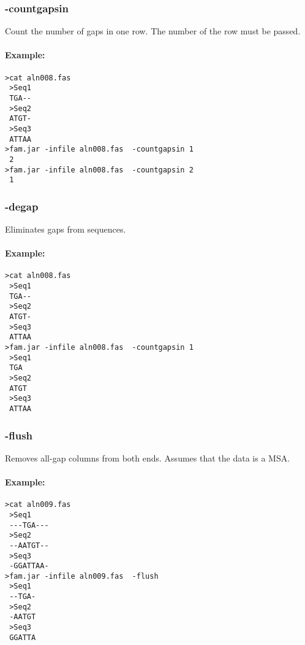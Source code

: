 \documentclass[a4paper, twoside,10pt]{article}
\begin{document}
\subsubsection{-countgapsin}
Count the number of gaps in one row. The number of the row must be passed.
\paragraph{Example:}
\begin{verbatim}
>cat aln008.fas
 >Seq1
 TGA--
 >Seq2
 ATGT-
 >Seq3
 ATTAA
>fam.jar -infile aln008.fas  -countgapsin 1
 2
>fam.jar -infile aln008.fas  -countgapsin 2
 1
\end{verbatim}

\subsubsection{-degap}
Eliminates gaps from sequences.
\paragraph{Example:}
\begin{verbatim}
>cat aln008.fas
 >Seq1
 TGA--
 >Seq2
 ATGT-
 >Seq3
 ATTAA
>fam.jar -infile aln008.fas  -countgapsin 1
 >Seq1
 TGA
 >Seq2
 ATGT
 >Seq3
 ATTAA
\end{verbatim}

\subsubsection{-flush}
Removes all-gap columns from both ends. Assumes that the data is a MSA.
\paragraph{Example:}
\begin{verbatim}
>cat aln009.fas
 >Seq1
 ---TGA---
 >Seq2
 --AATGT--
 >Seq3
 -GGATTAA-
>fam.jar -infile aln009.fas  -flush
 >Seq1
 --TGA-
 >Seq2
 -AATGT
 >Seq3
 GGATTA
\end{verbatim}
\end{document}
